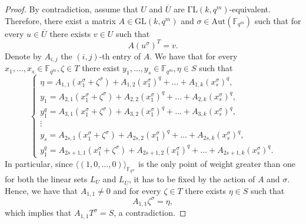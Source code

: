 \documentclass[10pt,a4paper]{amsart}
\newcommand{\fqm}{\mathbb{F}_{q^m}}
\newcommand{\la}{\langle}
\newcommand{\ra}{\rangle}
\begin{document}
\begin{proof}
    By contradiction, assume that $U$ and $\overline{U}$ are $\mathrm{\Gamma L}(k,q^m)$-equivalent. Therefore, there exist a matrix $A \in \mathrm{GL}(k,q^m)$ and $\sigma \in \mathrm{Aut}(\fqm)$ such that for every $u \in \overline{U}$ there exists $v \in U$ such that
    \[ A (u^\sigma)^T=v. \]
    Denote by $A_{i,j}$ the $(i,j)$-th entry of $A$. 
    We have that for every $x_1,\ldots,x_s\in \mathbb{F}_{q^m}, \zeta\in T$ there exist $y_1,\ldots,y_s\in \mathbb{F}_{q^m}, \eta\in S$ such that
    \[
    \left\{
    \begin{array}{llll}
    \eta =A_{1,1}(x_1^\sigma+\zeta^\sigma)+A_{1,2}(x_1^\sigma)^q+\ldots+A_{1,k}(x_s^\sigma)^q,\\
    y_1=A_{2,1}(x_1^\sigma+\zeta^\sigma)+A_{2,2}(x_1^\sigma)^q+\ldots+A_{2,k}(x_s^\sigma)^q,\\
    y_1^q=A_{3,1}(x_1^\sigma+\zeta^\sigma)+A_{3,2}(x_1^\sigma)^q+\ldots+A_{3,k}(x_s^\sigma)^q,\\
    \vdots\\
    y_s=A_{2s,1}(x_1^\sigma+\zeta^\sigma)+A_{2s,2}(x_1^\sigma)^q+\ldots+A_{2s,k}(x_s^\sigma)^q,\\
    y_1^q=A_{2s+1,1}(x_1^\sigma+\zeta^\sigma)+A_{2s+1,2}(x_1^\sigma)^q+\ldots+A_{2s+1,k}(x_s^\sigma)^q.
    \end{array}
    \right.
    \]
    In particular, since $\la (1,0,\ldots,0)\ra_{\fqm}$ is the only point of weight greater than one for both the linear sets $L_U$ and $L_{\overline{U}}$, it has to be fixed by the action of $A$ and $\sigma$. Hence, we have that $A_{1,1}\neq 0$ and for every $\zeta\in T$ there exists $\eta\in S$ such that 
    \[ A_{1,1} \zeta^\sigma=\eta,\]
    which implies that $A_{1,1}T^\sigma=S$, a contradiction.
\end{proof}
\end{document}
